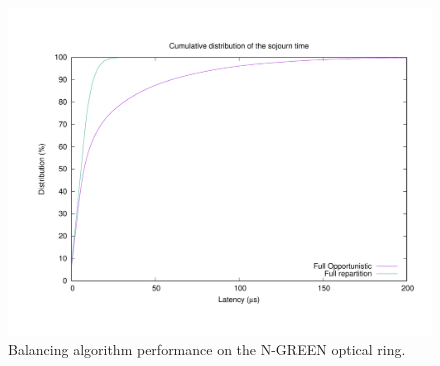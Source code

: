 \documentclass[]{algotel}
\newcommand{\todo}[1]{{\color{red} TODO: {#1}}}
\begin{document}
   \begin{figure}[h]
\centering
      \includegraphics[scale=0.4]{optim.pdf}
     \caption{Balancing algorithm performance on the N-GREEN optical ring.}   \label{fig:optimres}
  \end{figure}
  

  
\end{document}
